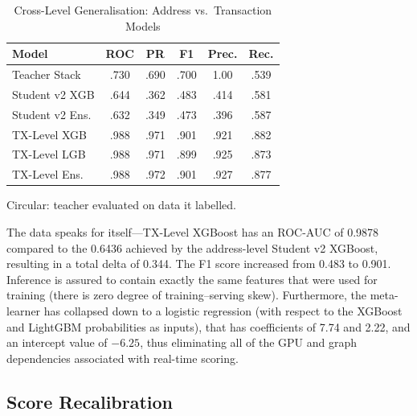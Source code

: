 \documentclass[journal]{IEEEtran}
\begin{document}
\begin{table}[!t]
\centering
\caption{Cross-Level Generalisation: Address vs.\ Transaction Models}
\label{tab:crosslevel}
\begin{threeparttable}
\begin{tabular}{lccccc}
\toprule
\textbf{Model} & \textbf{ROC} & \textbf{PR} & \textbf{F1} & \textbf{Prec.} & \textbf{Rec.} \\
\midrule
Teacher Stack\tnote{$\dagger$} & .730 & .690 & .700 & 1.00 & .539 \\
Student v2 XGB & .644 & .362 & .483 & .414 & .581 \\
Student v2 Ens. & .632 & .349 & .473 & .396 & .587 \\
TX-Level XGB & .988 & .971 & .901 & .921 & .882 \\
TX-Level LGB & .988 & .971 & .899 & .925 & .873 \\
TX-Level Ens. & .988 & .972 & .901 & .927 & .877 \\
\bottomrule
\end{tabular}
\begin{tablenotes}
\item[$\dagger$] Circular: teacher evaluated on data it labelled.
\end{tablenotes}
\end{threeparttable}
\end{table}

The data speaks for itself---TX-Level XGBoost has an ROC-AUC of 0.9878 compared to the 0.6436 achieved by the address-level Student v2 XGBoost, resulting in a total delta of 0.344. The F1 score increased from 0.483 to 0.901. Inference is assured to contain exactly the same features that were used for training (there is zero degree of training--serving skew). Furthermore, the meta-learner has collapsed down to a logistic regression (with respect to the XGBoost and LightGBM probabilities as inputs), that has coefficients of 7.74 and 2.22, and an intercept value of $-6.25$, thus eliminating all of the GPU and graph dependencies associated with real-time scoring.

\subsection{Score Recalibration}
\end{document}
